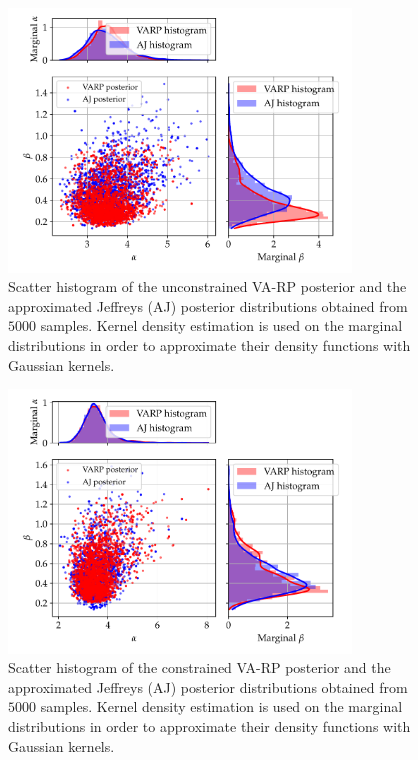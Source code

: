 

\begin{figure}[h]
    \centering
    \includegraphics[height=7cm]{figures/constr-frags/hist_post_marg_unconstrained_new.pdf}%
    \caption{Scatter histogram of the unconstrained VA-RP posterior and the approximated Jeffreys (AJ)  posterior distributions obtained from $5000$ samples. Kernel density estimation is used on the marginal distributions in order to approximate their density functions with Gaussian kernels.}
    \label{fig:scatterhist_unconstr}
\end{figure}

\begin{figure}[h!]
    \centering
    \includegraphics[height=7cm]{figures/constr-frags/hist_post_marg_constrained_new.pdf}
    \caption{Scatter histogram of the constrained VA-RP posterior and the approximated Jeffreys (AJ)  posterior distributions obtained from $5000$ samples. Kernel density estimation is used on the marginal distributions in order to approximate their density functions with Gaussian kernels.}
    \label{fig:scatterhist_constr}
\end{figure}




